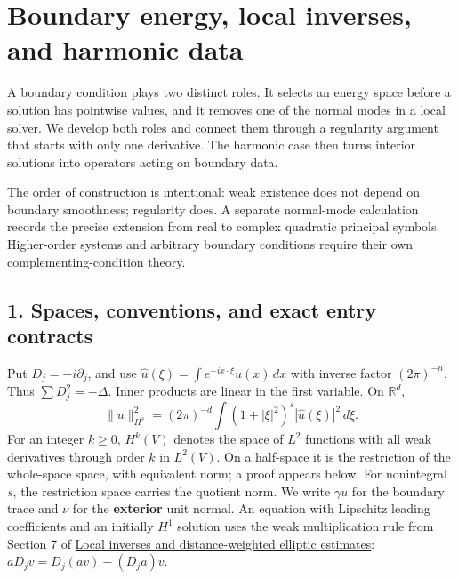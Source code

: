 \documentclass[
  11pt,
]{article}
\author{}
\date{}
\makeatletter
\let\ReaderOriginalAnchorStart\hyper@anchorstart
\let\ReaderOriginalAnchorEnd\hyper@anchorend
\let\ReaderPendingAliases\@empty
\def\ReaderArmAliases#1{\gdef\ReaderPendingAliases{#1}}
\def\hyper@anchorstart#1{\ReaderIfNativeAnchorTF{#1}{\ReaderPendingAliases\global\let\ReaderPendingAliases\@empty}{}\ReaderOriginalAnchorStart{#1}}
\makeatother
\begin{document}
\ReaderArmAliases{\ReaderOriginalAnchorStart{boundary-energy-local-inverses-and-harmonic-data}\ReaderOriginalAnchorEnd}
\section{Boundary energy, local inverses, and harmonic
data}\label{boundary-energy-local-inverses-and-harmonic-data}

A boundary condition plays two distinct roles. It selects an energy
space before a solution has pointwise values, and it removes one of the
normal modes in a local solver. We develop both roles and connect them
through a regularity argument that starts with only one derivative. The
harmonic case then turns interior solutions into operators acting on
boundary data.

The order of construction is intentional: weak existence does not depend
on boundary smoothness; regularity does. A separate normal-mode
calculation records the precise extension from real to complex quadratic
principal symbols. Higher-order systems and arbitrary boundary
conditions require their own complementing-condition theory.

\ReaderArmAliases{\ReaderOriginalAnchorStart{AN03-SBD-001}\ReaderOriginalAnchorEnd\begingroup\expandafter\def\csname @currentHref\endcsname{AN03-SBD-001}\label{AN03-SBD-001}\endgroup\ReaderOriginalAnchorStart{an03-sbd-001-spaces-conventions-and-exact-entry-contracts}\ReaderOriginalAnchorEnd\begingroup\expandafter\def\csname @currentHref\endcsname{an03-sbd-001-spaces-conventions-and-exact-entry-contracts}\label{an03-sbd-001-spaces-conventions-and-exact-entry-contracts}\endgroup\ReaderOriginalAnchorStart{1-spaces-conventions-and-exact-entry-contracts}\ReaderOriginalAnchorEnd\begingroup\expandafter\def\csname @currentHref\endcsname{1-spaces-conventions-and-exact-entry-contracts}\label{1-spaces-conventions-and-exact-entry-contracts}\endgroup\ReaderOriginalAnchorStart{spaces-conventions-and-exact-entry-contracts}\ReaderOriginalAnchorEnd}
\subsection{1. Spaces, conventions, and exact entry
contracts}\label{spaces-conventions-and-exact-entry-contracts}

Put \(D_j=-i\partial_j\), and use
\(\widehat u(\xi)=\int e^{-ix\cdot\xi}u(x)\,dx\) with inverse factor
\((2\pi)^{-n}\). Thus \(\sum D_j^2=-\Delta\). Inner products are linear
in the first variable. On \(\mathbb R^d\), \[
 \|u\|_{H^s}^2=(2\pi)^{-d}\int (1+|\xi|^2)^s|\widehat u(\xi)|^2\,d\xi. \tag{B1}
\] For an integer \(k\geq0\), \(H^k(V)\) denotes the space of \(L^2\)
functions with all weak derivatives through order \(k\) in \(L^2(V)\).
On a half-space it is the restriction of the whole-space space, with
equivalent norm; a proof appears below. For nonintegral \(s\), the
restriction space carries the quotient norm. We write \(\gamma u\) for
the boundary trace and \(\nu\) for the \textbf{exterior} unit normal. An
equation with Lipschitz leading coefficients and an initially \(H^1\)
solution uses the weak multiplication rule from Section 7 of
\href{local-elliptic-coefficients.pdf}{Local inverses and
distance-weighted elliptic estimates}: \(aD_jv=D_j(av)-(D_ja)v\).
\end{document}

